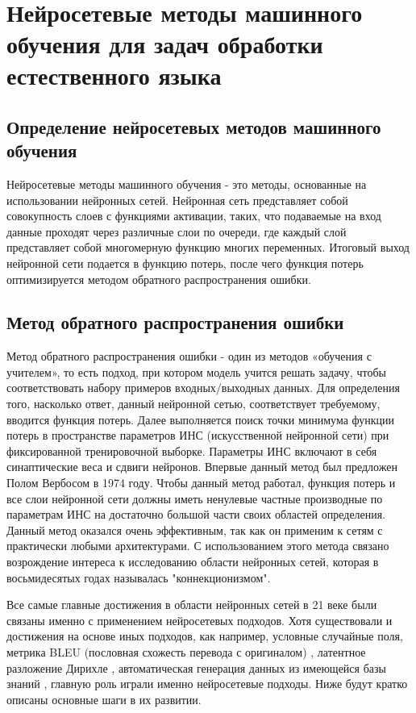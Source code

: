   \chapter{Нейросетевые методы машинного обучения для задач обработки естественного языка}\label{ch:nn} 
  

\section{Определение нейросетевых методов машинного обучения}
Нейросетевые методы машинного обучения - это методы, основанные на использовании нейронных сетей. Нейронная сеть представляет собой совокупность слоев с функциями активации, таких, что подаваемые на вход данные проходят через различные слои по очереди, где каждый слой представляет собой многомерную функцию многих переменных. Итоговый выход нейронной сети подается в функцию потерь, после чего функция потерь оптимизируется методом обратного распространения ошибки. 
\section{Метод обратного распространения ошибки}
Метод обратного распространения ошибки - один из методов «обучения с учителем», то есть подход, при котором модель учится решать задачу, чтобы соответствовать набору примеров входных/выходных данных. Для определения того, насколько ответ, данный нейронной сетью, соответствует требуемому, вводится функция потерь. Далее выполняется поиск точки минимума функции потерь в пространстве параметров ИНС (искусственной нейронной сети) при фиксированной тренировочной выборке. Параметры ИНС включают в себя синаптические веса и сдвиги нейронов. Впервые данный метод был предложен Полом Вербосом в 1974 году\cite{werbos_1974}. Чтобы данный метод работал, функция потерь и все слои нейронной сети должны иметь ненулевые частные производные по параметрам ИНС на достаточно большой части своих областей определения.
Данный метод оказался очень эффективным, так как он применим к сетям с практически любыми архитектурами. С использованием этого метода связано возрождение интереса к исследованию области нейронных сетей, которая в восьмидесятых годах называлась "коннекционизмом". 

Все самые главные достижения в области нейронных сетей в 21 веке были связаны именно с применением нейросетевых подходов. Хотя существовали и достижения на основе иных подходов, как например, условные случайные поля\cite{lafferty_2004}, метрика BLEU (пословная схожесть перевода с оригиналом) \cite{papineni_2001}, латентное разложение Дирихле \cite{blei_2003}, автоматическая генерация данных из имеющейся базы знаний \cite{mintz_2009}, главную роль играли именно нейросетевые подходы. Ниже будут кратко описаны основные шаги в их развитии.

